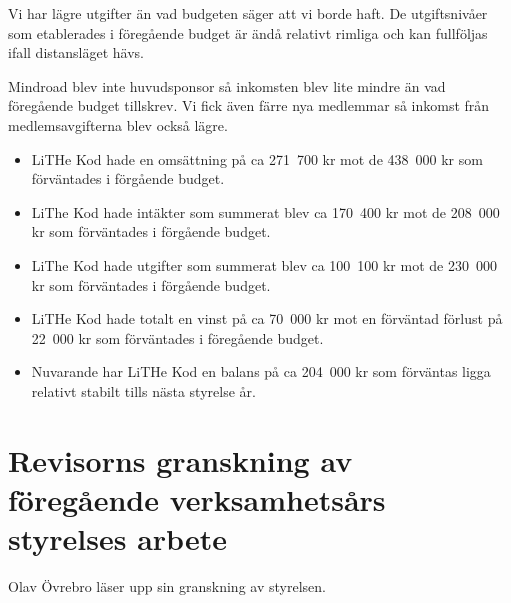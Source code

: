 \documentclass[a4paper]{article}
\begin{document}
\begin{displayquote}
  Vi har lägre utgifter än vad budgeten säger att vi borde haft. 
  De utgiftsnivåer som etablerades i föregående budget är ändå relativt
  rimliga och kan fullföljas ifall distansläget hävs. 
  
  Mindroad blev inte huvudsponsor så inkomsten blev lite mindre än vad 
  föregående budget tillskrev. Vi fick även färre nya medlemmar så inkomst 
  från medlemsavgifterna blev också lägre.
  
  \begin{itemize}[leftmargin=*]
    \item LiTHe Kod hade en omsättning på ca 271~700 kr mot de 438~000 kr som förväntades i förgående budget. 
    \item LiThe Kod hade intäkter som summerat blev ca 170~400 kr mot de 208~000 kr som förväntades i förgående budget.
    \item LiThe Kod hade utgifter som summerat blev ca 100~100 kr mot de 230~000 kr som förväntades i förgående budget.
    \item LiTHe Kod hade totalt en vinst på ca 70~000 kr mot en förväntad förlust på 22~000 kr som förväntades i föregående budget.
    \item Nuvarande har LiTHe Kod en balans på ca 204~000 kr som förväntas ligga relativt stabilt tills nästa styrelse år. 
  \end{itemize}
\end{displayquote}

\section{Revisorns granskning av föregående verksamhetsårs styrelses arbete}

Olav Övrebro läser upp sin granskning av styrelsen.
\end{document}
